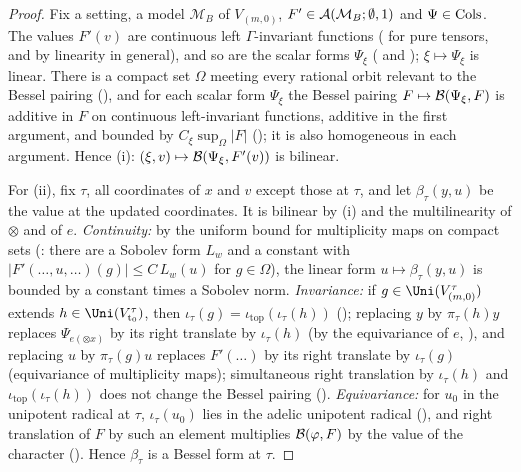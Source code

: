 \begin{proof}
Fix a setting, a model $\mathcal M_B$ of $V_{(m,0)}$, $F'\in\mathcal A(\mathcal M_B;\emptyset,1)$ and $\Psi\in\mathrm{Cols}$. The values $F'(v)$ are
continuous left $\Gamma$-invariant functions ( for pure tensors, and by
linearity in general), and so are the scalar forms $\Psi_\xi$ ( and );
$\xi\mapsto\Psi_\xi$ is linear. There is a compact set $\Omega$ meeting every rational orbit relevant to the Bessel pairing
(), and for each scalar form $\Psi_\xi$ the Bessel pairing
$F\mapsto\mathcal B(\Psi_\xi,F)$ is additive in $F$ on continuous left-invariant functions, additive in the first argument, and bounded by
$C_\xi\sup_\Omega|F|$ (); it is also homogeneous in each
argument. Hence (i): $(\xi,v)\mapsto\mathcal B(\Psi_\xi,F'(v))$ is bilinear.

For (ii), fix $\tau$, all coordinates of $x$ and $v$ except those at $\tau$, and let $\beta_\tau(y,u)$ be the value at the updated
coordinates. It is bilinear by (i) and the multilinearity of $\otimes$ and of $e$. \emph{Continuity:} by the uniform bound for
multiplicity maps on compact sets (: there are a Sobolev form $L_w$ and a constant with
$|F'(\ldots,u,\ldots)(g)|\le C\,L_w(u)$ for $g\in\Omega$), the linear form $u\mapsto\beta_\tau(y,u)$ is bounded by a constant times a Sobolev
norm. \emph{Invariance:} if $g\in\Uni(V_{(m,0)}^\tau)$ extends $h\in\Uni(V_{\fst_0}^\tau)$, then
$\iota_\tau(g)=\iota_{\mathrm{top}}(\iota_\tau(h))$ (); replacing $y$ by
$\pi_\tau(h)y$ replaces $\Psi_{e(\otimes x)}$ by its right translate by $\iota_\tau(h)$ (by the equivariance of $e$,
), and replacing $u$ by $\pi_\tau(g)u$ replaces $F'(\ldots)$ by its right translate by
$\iota_\tau(g)$ (equivariance of multiplicity maps); simultaneous right translation by $\iota_\tau(h)$ and $\iota_{\mathrm{top}}(\iota_\tau(h))$
does not change the Bessel pairing ().
\emph{Equivariance:} for $u_0$ in the unipotent radical at $\tau$, $\iota_\tau(u_0)$ lies in the adelic unipotent radical
(), and right translation of $F$ by such an element multiplies
$\mathcal B(\varphi,F)$ by the value of the character (). Hence
$\beta_\tau$ is a Bessel form at $\tau$.
\end{proof}


